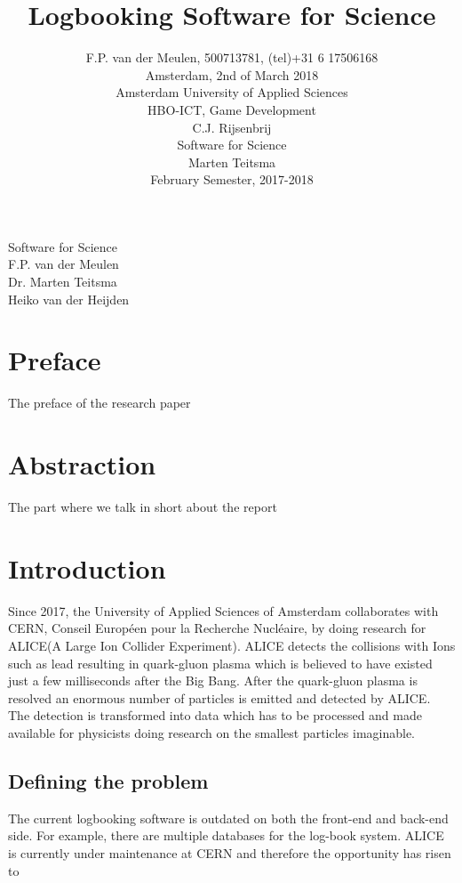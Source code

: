 \documentclass[paper=a4, fontsize=11pt,twoside]{scrartcl}	%
\title{Logbooking Software for Science}
\author{
		F.P. van der Meulen, 500713781, (tel)+31 6 17506168\\
		Amsterdam, 2nd of March 2018\\	
		Amsterdam University of Applied Sciences\\
		HBO-ICT, Game Development\\
		C.J. Rijsenbrij\\	
		Software for Science\\
		Marten Teitsma\\
		February Semester, 2017-2018\\
}
\makeatletter
\def\printtitle{%
    {\centering \@title\par}}
\def\printauthor{%
    {\centering \large \@author}}
\makeatother
\begin{document}
\thispagestyle{empty}		%


\printtitle
Software for Science\\
F.P. van der Meulen \\
Dr. Marten Teitsma\\
Heiko van der Heijden

\newpage 
\printtitle
\printauthor

\newpage

\section{Preface}
The preface of the research paper

\newpage
\tableofcontents

\newpage


\section{Abstraction}
The part where we talk in short about the report
\newpage
\section{Introduction}
Since 2017, the University of Applied Sciences of Amsterdam collaborates with CERN, Conseil Européen pour la Recherche Nucléaire, by doing research for ALICE(A Large Ion Collider Experiment). ALICE detects the collisions with Ions such as lead resulting in quark-gluon plasma which is believed to have existed just a few milliseconds after the Big Bang. After the quark-gluon plasma is resolved an enormous number of particles is emitted and detected by ALICE. The  detection  is  transformed  into  data  which  has  to  be  processed  and  made available for physicists doing research on the smallest particles imaginable.\\
\subsection{Defining the problem}
The current logbooking software is outdated on both the front-end and back-end side. For example, there are multiple databases for the log-book system. ALICE is currently under maintenance at CERN and therefore the opportunity has risen to 
\end{document}
